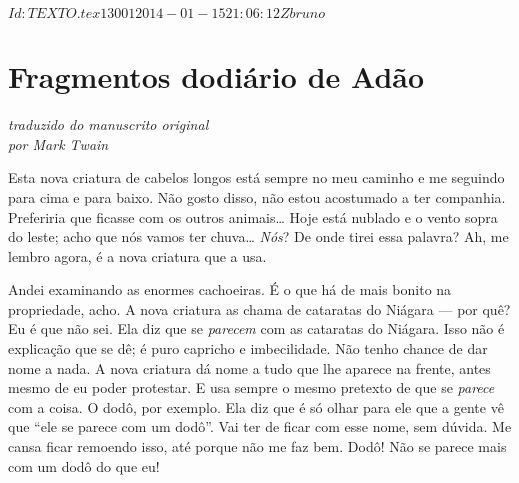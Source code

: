 \SVN $Id: TEXTO.tex 13001 2014-01-15 21:06:12Z bruno $

\chapter[Fragmentos do diário de Adão]{Fragmentos do\break diário de Adão}





\begin{flushright}
\itshape{traduzido do manuscrito original\\ por Mark Twain}
\end{flushright}



Esta nova criatura de cabelos longos está sempre no meu caminho e
me seguindo para cima e para baixo. Não gosto disso, não estou acostumado
a ter companhia. Preferiria que ficasse com os outros animais\ldots{}
Hoje está nublado e o vento sopra do leste; acho que nós vamos ter chuva\ldots{}
\textit{Nós}? De onde tirei essa palavra? Ah, me lembro agora, é a nova criatura que a usa.

  Andei examinando as enormes cachoeiras. É o que há de mais bonito
na propriedade, acho. A nova criatura as chama de cataratas do Niágara --- por
quê? Eu é que não sei. Ela diz que se \textit{parecem} com as cataratas do Niágara.
Isso não é explicação que se dê; é puro capricho e imbecilidade. Não tenho 
chance de dar nome a nada. A nova criatura dá nome a tudo que lhe aparece na
frente, antes mesmo de eu poder protestar. E usa sempre o mesmo pretexto de que se
\textit{parece} com a coisa. O dodô, por exemplo. Ela diz que é só olhar para ele
que a gente vê que “ele se parece com um dodô”. Vai ter de ficar com esse
nome, sem dúvida. Me cansa ficar remoendo isso, até porque não me faz bem.
Dodô! Não se parece mais com um dodô do que eu!

